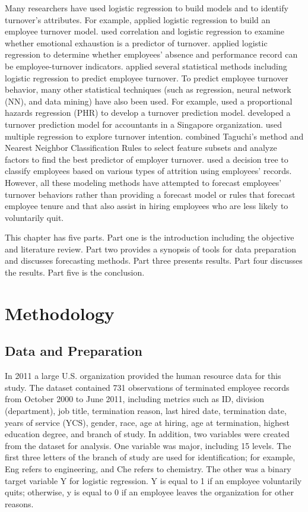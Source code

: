 Many researchers have used logistic regression to build models and to identify turnover's attributes. For example, \citet{balfour1993} applied logistic regression to build an employee turnover model. \citet{wright1998} used correlation and logistic regression to examine whether emotional exhaustion is a predictor of turnover. \citet{morrow1999} applied logistic regression to determine whether employees' absence and performance record can be employee-turnover indicators. \citet{nagadevara2008} applied several statistical methods including logistic regression to predict employee turnover.
To predict employee turnover behavior, many other statistical techniques (such as regression, neural network (NN), and data mining) have also been used. For example, \citet{ng1991} used a proportional hazards regression (PHR) to develop a turnover prediction model. \citet{RN6} developed a turnover prediction model for accountants in a Singapore organization. \citet{RN8} used multiple regression to explore turnover intention. \citet{RN10} combined Taguchi's method and Nearest Neighbor Classification Rules to select feature subsets and analyze factors to find the best predictor of employer turnover. \citet{alao2013} used a decision tree to classify employees based on various types of attrition using employees' records. However, all these modeling methods have attempted to forecast employees' turnover behaviors rather than providing a forecast model or rules that forecast employee tenure and that also assist in hiring employees who are less likely to voluntarily quit. 

This chapter has five parts. Part one is the introduction including the objective and literature review. Part two provides a synopsis of tools for data preparation and discusses forecasting methods. Part three presents results. Part four discusses the results. Part five is the conclusion. 
\section{Methodology}
\subsection{Data and Preparation}
In 2011 a large U.S. organization provided the human resource data for this study. The dataset contained 731 observations of terminated employee records from October 2000 to June 2011, including metrics such as ID, division (department), job title, termination reason, last hired date, termination date, years of service (YCS), gender, race, age at hiring, age at termination, highest education degree, and branch of study. 
In addition, two variables were created from the dataset for analysis. One variable was major, including 15 levels. The first three letters of the branch of study are used for identification; for example, Eng refers to engineering, and Che refers to chemistry. The other was a binary target variable Y for logistic regression. Y is equal to 1 if an employee voluntarily quits; otherwise, y is equal to 0 if an employee leaves the organization for other reasons.
